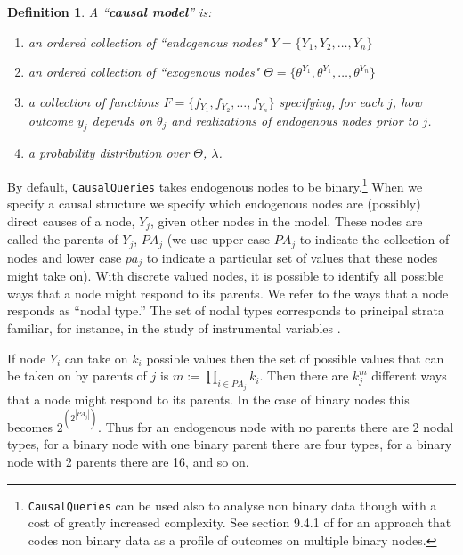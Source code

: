 \documentclass[
  11pt,
  article]{jss}
\newtheorem{definition}{Definition}
\begin{document}
\begin{definition}
  
  A ``\textbf{causal model}'' is:
  \begin{enumerate}
    \item an ordered collection of ``endogenous nodes" $Y = \{Y_1, Y_2, \dots, Y_n\}$
    \item an ordered collection of ``exogenous nodes" $\Theta = \{\theta^{Y_1}, \theta^{Y_1}, \dots, \theta^{Y_n}\}$
    \item a collection of functions $F = \{f_{Y_1}, f_{Y_2}, \dots, f_{Y_n}\}$ specifying, for each $j$, how outcome $y_j$ depends on $\theta_j$ and realizations of endogenous nodes prior to $j$.
    \item a probability distribution over $\Theta$, $\lambda$.
  \end{enumerate}
  
\end{definition}

By default, \texttt{CausalQueries} takes endogenous nodes to be
binary.\footnote{\texttt{CausalQueries} can be used also to analyse non
  binary data though with a cost of greatly increased complexity. See
  section 9.4.1 of \citet{humphreys_integrated_2023} for an approach
  that codes non binary data as a profile of outcomes on multiple binary
  nodes.} When we specify a causal structure we specify which endogenous
nodes are (possibly) direct causes of a node, \(Y_j\), given other nodes
in the model. These nodes are called the parents of \(Y_j\), \(PA_j\)
(we use upper case \(PA_j\) to indicate the collection of nodes and
lower case \(pa_j\) to indicate a particular set of values that these
nodes might take on). With discrete valued nodes, it is possible to
identify all possible ways that a node might respond to its parents. We
refer to the ways that a node responds as ``nodal type.'' The set of
nodal types corresponds to principal strata familiar, for instance, in
the study of instrumental variables \citep{frangakis_principal_2002}.

If node \(Y_i\) can take on \(k_i\) possible values then the set of
possible values that can be taken on by parents of \(j\) is
\(m :=\prod_{i\in PA_j}k_i\). Then there are \(k_j^{m}\) different ways
that a node might respond to its parents. In the case of binary nodes
this becomes \(2^{\left(2^{|PA_j|}\right)}\). Thus for an endogenous
node with no parents there are 2 nodal types, for a binary node with one
binary parent there are four types, for a binary node with 2 parents
there are 16, and so on.
\end{document}
